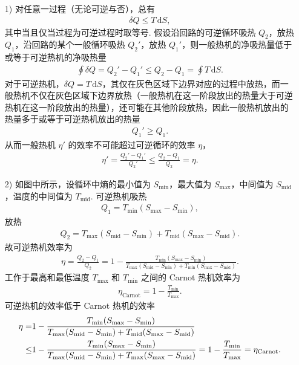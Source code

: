 \documentclass{assignment}
\begin{document}
\begin{pf}
    \begin{itemize}
        \item[1)] 对任意一过程（无论可逆与否），总有
        \begin{align}
            \delta Q\leq T\,\mathrm{d}S,
        \end{align}
        其中当且仅当过程为可逆过程时取等号. 假设沿回路的可逆循环吸热 $Q_2$，放热 $Q_1$，沿回路的某个一般循环吸热 $Q_2'$，放热 $Q_1'$，则一般热机的净吸热量低于或等于可逆热机的净吸热量
        \begin{align}
            \oint\delta Q=Q_2'-Q_1'\leq Q_2-Q_1=\oint T\,\mathrm{d}S.
        \end{align}
        对于可逆热机，$\delta Q=T\,\mathrm{d}S$，其仅在灰色区域下边界对应的过程中放热，而一般热机不仅在灰色区域下边界放热（一般热机在这一阶段放出的热量大于可逆热机在这一阶段放出的热量），还可能在其他阶段放热，因此一般热机放出的热量多于或等于可逆热机放出的热量
        \begin{align}
            Q_1'\geq Q_1.
        \end{align}
        从而一般热机 $\eta'$ 的效率不可能超过可逆循环的效率 $\eta$，
        \begin{align}
            \eta'=\frac{Q_2'-Q_1'}{Q_2'}\leq\frac{Q_2-Q_1}{Q_2}=\eta.
        \end{align}
        \item[2)] 如图中所示，设循环中熵的最小值为 $S_{\min}$，最大值为 $S_{\max}$，中间值为 $S_{\text{mid}}$，温度的中间值为 $T_{\text{mid}}$. 可逆热机吸热
        \begin{align}
            Q_1=T_{\min}(S_{\max}-S_{\min}),
        \end{align}
        放热
        \begin{align}
            Q_2=T_{\max}(S_{\text{mid}}-S_{\min})+T_{\text{mid}}(S_{\max}-S_{\text{mid}}).
        \end{align}
        故可逆热机效率为
        \begin{align}
            \eta=\frac{Q_2-Q_1}{Q_2}=1-\frac{T_{\min}(S_{\max}-S_{\min})}{T_{\max}(S_{\text{mid}}-S_{\text{min}})+T_{\min}(S_{\max}-S_{\text{mid}})}.
        \end{align}
        工作于最高和最低温度 $T_{\max}$ 和 $T_{\min}$ 之间的 Carnot 热机效率为
        \begin{align}
            \eta_{\text{Carnot}}=1-\frac{T_{\min}}{T_{\max}}.
        \end{align}
        可逆热机的效率低于 Carnot 热机的效率
        \begin{align}
            \notag\eta=&1-\frac{T_{\min}(S_{\max}-S_{\min})}{T_{\max}(S_{\text{mid}}-S_{\text{min}})+T_{\text{mid}}(S_{\max}-S_{\text{mid}})}\\
            \leq&1-\frac{T_{\min}(S_{\max}-S_{\min})}{T_{\max}(S_{\text{mid}}-S_{\text{min}})+T_{\max}(S_{\max}-S_{\text{mid}})}=1-\frac{T_{\min}}{T_{\max}}=\eta_{\text{Carnot}}.
        \end{align}
    \end{itemize}
\end{pf}
\end{document}
